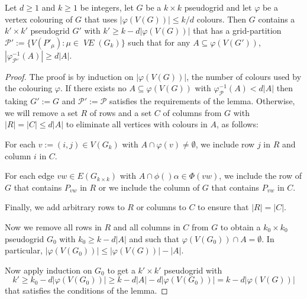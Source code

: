 \documentclass{patmorin}
\DeclareMathOperator{\VE}{\mathit{VE}}
\begin{document}

\begin{lem}\label{only_frequent}
  Let $d\ge 1$ and $k\ge 1$ be integers, let $G$ be a $k\times k$ pseudogrid and let $\varphi$ be a vertex colouring of $G$ that uses $|\varphi(V(G))|\le k/d$ colours.
  Then $G$ contains a $k'\times k'$ pseudogrid $G'$ with $k'\ge k - d|\varphi(V(G))|$ that has a grid-partition $\mathcal{P}':=\{V(P'_\mu):\mu\in \VE(G_{k})\}$ such that
  for any $A\subseteq \varphi(V(G'))$, $|\varphi_{\mathcal{P}'}^{-1}(A)| \ge d|A|$.
\end{lem}

\begin{proof}
  The proof is by induction on $|\varphi(V(G))|$, the number of colours used by the colouring $\varphi$.  If there exists no $A\subseteq \varphi(V(G))$ with $\varphi_{\mathcal{P}}^{-1}(A) < d|A|$ then taking $G':=G$ and $\mathcal{P}':=\mathcal{P}$ satisfies the requirements of the lemma. Otherwise, we will remove a set $R$ of rows and a set $C$ of columns from $G$ with $|R|=|C|\le d|A|$ to eliminate all vertices with colours in $A$, as follows:
  \begin{compactitem}
    \item For each $v:=(i,j)\in V(G_{k})$ with $A\cap\varphi(v)\neq\emptyset$, we include row $j$ in $R$ and column $i$ in $C$.
    \item For each edge $vw\in E(G_{k\times k})$ with $A\cap\phi()\alpha\in\Phi(vw)$, we include the row of $G$ that contains $P_{vw}$ in $R$ or we include the column of $G$ that contains $P_{vw}$ in $C$.
    \item Finally, we add arbitrary rows to $R$ or columns to $C$ to ensure that $|R|=|C|$.
  \end{compactitem}
  Now we remove all rows in $R$ and all columns in $C$ from $G$ to obtain a $k_0\times k_0$ pseudogrid $G_0$ with $k_0\ge k-d|A|$ and such that $\varphi(V(G_0))\cap A=\emptyset$.  In particular, $|\varphi(V(G_0))|\le |\varphi(V(G))|-|A|$.

  Now apply induction on $G_0$ to get a $k'\times k'$ pseudogrid with
  \[  k'\ge k_0-d|\varphi(V(G_0))|  \ge k-d|A|-d|\varphi(V(G_0))|= k - d|\varphi(V(G))|
  \]
  that satisfies the conditions of the lemma.
\end{proof}
\end{document}
